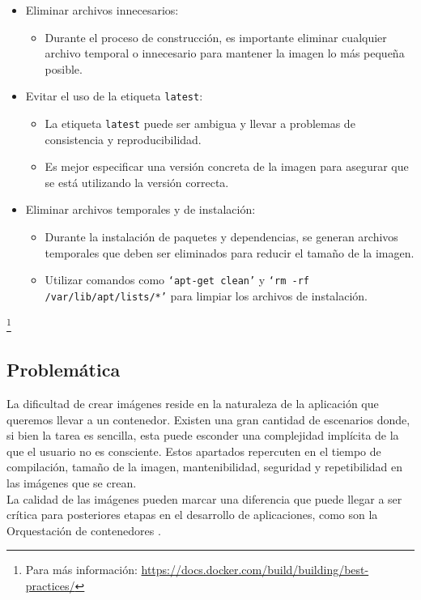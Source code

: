 \documentclass[12pt, a4paper, twoside]{article}
\begin{document}
\begin{itemize}
    \item Eliminar archivos innecesarios:
    \begin{itemize}
        \item Durante el proceso de construcción, es importante eliminar cualquier archivo temporal o innecesario para mantener la imagen lo más pequeña posible.
    \end{itemize}
    
    \item Evitar el uso de la etiqueta \texttt{latest}:
    \begin{itemize}
        \item La etiqueta \texttt{latest} puede ser ambigua y llevar a problemas de consistencia y reproducibilidad.
        \item Es mejor especificar una versión concreta de la imagen para asegurar que se está utilizando la versión correcta.
    \end{itemize}
    
    \item Eliminar archivos temporales y de instalación:
    \begin{itemize}
        \item Durante la instalación de paquetes y dependencias, se generan archivos temporales que deben ser eliminados para reducir el tamaño de la imagen.
        \item Utilizar comandos como \texttt{`apt-get clean'} y \texttt{`rm -rf /var/lib/apt/lists/*'} para limpiar los archivos de instalación.
    \end{itemize}
    

    
\end{itemize}
\footnote{Para más información: \href{https://docs.docker.com/build/building/best-practices/}{https://docs.docker.com/build/building/best-practices/}}
\newpage 

\subsection{Problemática}
La dificultad de crear imágenes reside en la naturaleza de la aplicación que queremos llevar a un contenedor. Existen una gran cantidad de escenarios donde, si bien la tarea es sencilla, esta puede esconder una complejidad implícita de la que el usuario no es consciente. 
Estos apartados repercuten en el tiempo de compilación, tamaño de la imagen, mantenibilidad, seguridad y repetibilidad en las imágenes que se crean. \\
La calidad de las imágenes pueden marcar una diferencia que puede llegar a ser crítica para posteriores etapas en el desarrollo de aplicaciones, como son la Orquestación de contenedores \cite{ibm_container_orchestration}.
\end{document}
